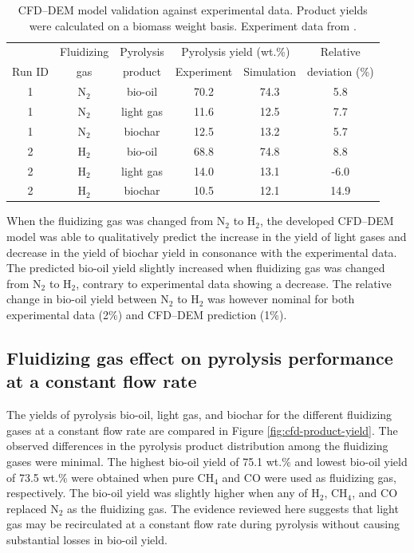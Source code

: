\begin{table}[H]
    \centering
    \caption{CFD–DEM model validation against experimental data. Product yields were calculated on a biomass weight basis. Experiment data from \cite{French-2021}.}
    \label{tab:cfddem-validation}
    \begin{tabular}{cccccc}
        \toprule
               & Fluidizing & Pyrolysis & \multicolumn{2}{c}{Pyrolysis yield (wt.\%)} & Relative \\
        Run ID & gas        & product   & Experiment & Simulation                     & deviation (\%) \\
        \midrule
        1 & N$_2$ & bio-oil & 70.2 & 74.3 & 5.8 \\
        1 & N$_2$ & light gas & 11.6 & 12.5 & 7.7 \\
        1 & N$_2$ & biochar & 12.5 & 13.2 & 5.7 \\
        2 & H$_2$ & bio-oil & 68.8 & 74.8 & 8.8 \\
        2 & H$_2$ & light gas & 14.0 & 13.1 & -6.0 \\
        2 & H$_2$ & biochar & 10.5 & 12.1 & 14.9 \\
        \bottomrule
    \end{tabular}
\end{table}

When the fluidizing gas was changed from N$_2$ to H$_2$, the developed CFD–DEM model was able to qualitatively predict the increase in the yield of light gases and decrease in the yield of biochar yield in consonance with the experimental data. The predicted bio-oil yield slightly increased when fluidizing gas was changed from N$_2$ to H$_2$, contrary to experimental data showing a decrease. The relative change in bio-oil yield between N$_2$ to H$_2$ was however nominal for both experimental data (2\%) and CFD–DEM prediction (1\%).

\subsection{Fluidizing gas effect on pyrolysis performance at a constant flow rate}

The yields of pyrolysis bio-oil, light gas, and biochar for the different fluidizing gases at a constant flow rate are compared in Figure \ref{fig:cfd-product-yield}. The observed differences in the pyrolysis product distribution among the fluidizing gases were minimal. The highest bio-oil yield of 75.1 wt.\% and lowest bio-oil yield of 73.5 wt.\% were obtained when pure CH$_4$ and CO were used as fluidizing gas, respectively. The bio-oil yield was slightly higher when any of H$_2$, CH$_4$, and CO replaced N$_2$ as the fluidizing gas. The evidence reviewed here suggests that light gas may be recirculated at a constant flow rate during pyrolysis without causing substantial losses in bio-oil yield.

